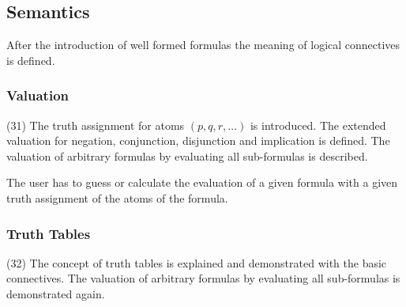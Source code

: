 
%



%


\subsection{Semantics}

After the introduction of well formed formulas the meaning of logical connectives is defined.

\subsubsection{Valuation}
\label{tut:31}
(31)
The truth assignment for atoms $(p,q,r,…)$ is introduced. 
The extended valuation for negation, conjunction, disjunction and implication is defined.
The valuation of arbitrary formulas by evaluating all sub-formulas is described.

The user has to guess or calculate the evaluation of a given formula with a given truth assignment of the atoms of the formula.

\subsubsection{Truth Tables}
\label{tut:32}
(32)
The concept of truth tables is explained and demonstrated with the basic connectives. 
The valuation of arbitrary formulas by evaluating all sub-formulas is demonstrated again.

